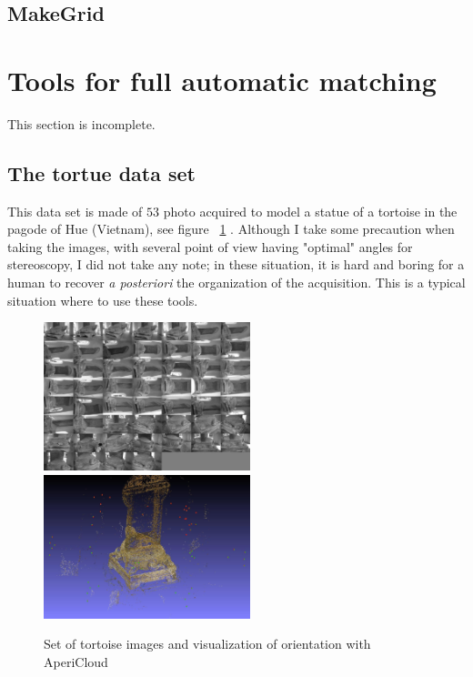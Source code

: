 \subsection{MakeGrid}
\label{MAKEGRID}





\section{Tools for full automatic  matching}

This section is incomplete.

\label{FullAutoMatch}

\subsection{The tortue data set}

This data set is made  of $53$ photo acquired to model a statue of a tortoise in the
pagode of Hue (Vietnam), see figure ~\ref{FIG:Tortue:Input} . Although I take some precaution when taking the images,
with several point of view having "optimal" angles for stereoscopy, I did not take any
note; in these situation,  it is hard and boring for a human to recover \emph{a posteriori} the organization
of the acquisition. This is a typical situation where to use these tools.


\begin{figure}
\begin{center}
\includegraphics[width=60mm]{FIGS/Tortue/AllTortues.jpg}
\includegraphics[width=60mm]{FIGS/Tortue/AP-snapshot00.jpg}
\end{center}
\caption{Set of tortoise images and visualization of orientation with AperiCloud}
\label{FIG:Tortue:Input}
\end{figure}




